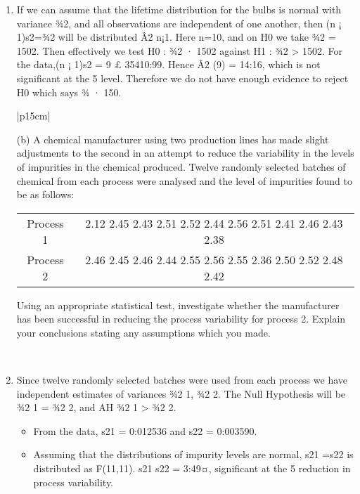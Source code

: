 \documentclass[a4paper,12pt]{article}
\begin{document}
\begin{enumerate}
\item If we can assume that the lifetime distribution for the bulbs is normal with variance ¾2,
and all observations are independent of one another, then (n ¡ 1)s2=¾2 will be distributed Â2
n¡1.
Here n=10, and on H0 we take ¾2 = 1502. Then effectively we test H0 : ¾2 · 1502 against
H1 : ¾2 > 1502.
For the data,(n ¡ 1)s2 = 9 £ 35410:99. Hence Â2
(9) = 14:16, which is not significant at the 5%
level. Therefore we do not have enough evidence to reject H0 which says ¾ · 150.
\begin{table}[ht!]
 
\centering
 
\begin{tabular}{|p{15cm}|}
 
\hline  

(b) A chemical manufacturer using two production lines has made slight adjustments to the second in an attempt to reduce the variability in the levels of impurities in the chemical produced.  Twelve randomly selected batches of chemical from each process were analysed and the level of impurities found to be as follows:

\begin{center}
\begin{tabular}{c|c|}
Process 1 & 2.12 2.45 2.43 2.51 2.52 2.44 2.56 2.51 2.41 2.46 2.43 2.38\\
Process 2 & 2.46 2.45 2.46 2.44 2.55 2.56 2.55 2.36 2.50 2.52 2.48 2.42
\end{tabular}
\end{center}
Using an appropriate statistical test, investigate whether the manufacturer has been successful in reducing the process variability for process 2.  
Explain your conclusions  stating any assumptions which you made.

\\ \hline
  
\end{tabular}

\end{table}

\item Since twelve randomly selected batches were used from each process we have independent estimates
of variances ¾2
1, ¾2
2. The Null Hypothesis will be ¾2
1 = ¾2
2, and AH ¾2
1 > ¾2
2.
\begin{itemize}
\item From the data, s21
= 0:012536 and s22
= 0:003590.
\item Assuming that the distributions of impurity levels are normal, s21
=s22
is distributed as F(11,11).
s21
s22
= 3:49¤, significant at the 5%
reduction in process variability.
\end{itemize}
\end{enumerate}
\end{document}
